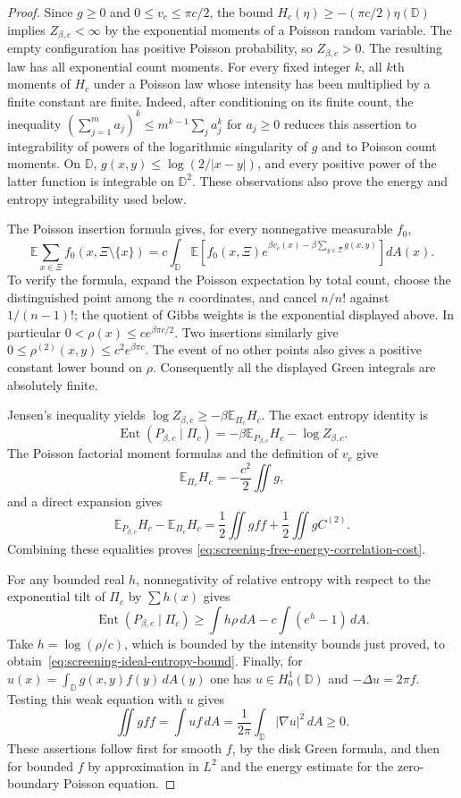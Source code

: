 \documentclass[11pt,a4paper]{article}
\numberwithin{equation}{section}
\theoremstyle{definition}
\theoremstyle{remark}
\newcommand{\D}{\mathbb D}
\begin{document}
\begin{proof}
Since $g\ge0$ and $0\le v_c\le\pi c/2$, the bound
$H_c(\eta)\ge-(\pi c/2)\eta(\D)$ implies
$Z_{\beta,c}<\infty$ by the exponential moments of a Poisson random
variable.  The empty configuration has positive Poisson probability,
so $Z_{\beta,c}>0$.  The resulting law has all exponential count
moments.  For every fixed integer $k$, all $k$th moments of $H_c$
under a Poisson law whose intensity has been multiplied by a finite
constant are finite.  Indeed, after conditioning on its finite count,
the inequality $(\sum_{j=1}^m a_j)^k\le m^{k-1}\sum_j a_j^k$ for
$a_j\ge0$ reduces this assertion to integrability of powers of the
logarithmic singularity of $g$ and to Poisson count moments.  On $\D$,
$g(x,y)\le\log(2/|x-y|)$, and every positive power of the latter
function is integrable on $\D^2$.  These observations also prove the
energy and entropy integrability used below.

The Poisson insertion formula gives, for every nonnegative measurable
$f_0$,
\[
 \mathbb E\sum_{x\in\Xi}f_0(x,\Xi\setminus\{x\})
 =c\int_\D\mathbb E\left[
 f_0(x,\Xi)e^{\beta v_c(x)-\beta\sum_{y\in\Xi}g(x,y)}
 \right]dA(x).
\]
To verify the formula, expand the Poisson expectation by total count,
choose the distinguished point among the $n$ coordinates, and cancel
$n/n!$ against $1/(n-1)!$; the quotient of Gibbs weights is the
exponential displayed above.  In particular
$0<\rho(x)\le c e^{\beta\pi c/2}$.  Two insertions similarly give
$0\le\rho^{(2)}(x,y)\le c^2e^{\beta\pi c}$.  The event of no other
points also gives a positive constant lower bound on $\rho$.
Consequently all the displayed Green integrals are absolutely finite.

Jensen's inequality yields
$\log Z_{\beta,c}\ge-\beta\mathbb E_{\Pi_c}H_c$.  The exact entropy
identity is
\[
 \operatorname{Ent}(P_{\beta,c}\mid\Pi_c)
       =-\beta\mathbb E_{P_{\beta,c}}H_c-\log Z_{\beta,c}.
\]
The Poisson factorial moment formulas and the definition of $v_c$
give
\[
 \mathbb E_{\Pi_c}H_c=-\frac{c^2}{2}\iint g,
\]
and a direct expansion gives
\[
 \mathbb E_{P_{\beta,c}}H_c-\mathbb E_{\Pi_c}H_c
   =\frac12\iint g f f+\frac12\iint g C^{(2)}.
\]
Combining these equalities proves
\eqref{eq:screening-free-energy-correlation-cost}.

For any bounded real $h$, nonnegativity of relative entropy with
respect to the exponential tilt of $\Pi_c$ by $\sum h(x)$ gives
\[
 \operatorname{Ent}(P_{\beta,c}\mid\Pi_c)
 \ge\int h\rho\,dA-c\int(e^h-1)\,dA.
\]
Take $h=\log(\rho/c)$, which is bounded by the intensity bounds just
proved, to obtain~\eqref{eq:screening-ideal-entropy-bound}.
Finally, for $u(x)=\int_\D g(x,y)f(y)\,dA(y)$ one has
$u\in H_0^1(\D)$ and $-\Delta u=2\pi f$.  Testing this weak equation
with $u$ gives
\[
 \iint g f f=\int uf\,dA
              =\frac1{2\pi}\int_\D|\nabla u|^2\,dA\ge0.
\]
These assertions follow first for smooth $f$, by the disk Green
formula, and then for bounded $f$ by approximation in $L^2$ and the
energy estimate for the zero-boundary Poisson equation.
\end{proof}
\end{document}
